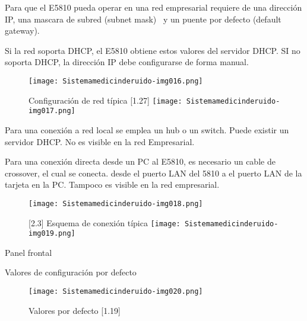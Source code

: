 \documentclass[paper=letter,oneside,fontsize=10pt,parskip=full]{article}
\begin{document}
Para que el E5810 pueda operar en una red empresarial requiere de una dirección IP, una mascara de subred (subnet mask)
\ y un puente por defecto (default gateway). 

Si la red soporta DHCP, el E5810 obtiene estos valores del servidor DHCP. SI no soporta DHCP, la dirección IP debe
configurarse de forma manual.



\begin{figure}
\centering
\texttt{[image: Sistemamedicinderuido-img016.png]}
\end{figure}

\bigskip



\begin{figure}
\centering
\begin{minipage}{8.841cm}
Configuración de red típica [1.27]
\texttt{[image: Sistemamedicinderuido-img017.png]}\end{minipage}
\end{figure}
Para una conexión a red local se emplea un hub o un switch. Puede existir un servidor DHCP. No es visible en la red
Empresarial. 

Para una conexión directa desde un PC al E5810, es necesario un cable de crossover, el cual se conecta. desde el puerto
LAN del 5810 a el puerto LAN de la tarjeta en la PC. Tampoco es visible en la red empresarial.

\begin{figure}
\centering
\texttt{[image: Sistemamedicinderuido-img018.png]}
\end{figure}
\begin{figure}
\centering
\begin{minipage}{11.88cm}
[2.3] Esquema de conexión típica
\texttt{[image: Sistemamedicinderuido-img019.png]}\end{minipage}
\end{figure}

\bigskip

Panel frontal

Valores de configuración por defecto



\begin{figure}
\centering
\texttt{[image: Sistemamedicinderuido-img020.png]}
\caption[Valores por defecto [1.19{]}]{Valores por defecto [1.19]}

\end{figure}

\bigskip
\end{document}
